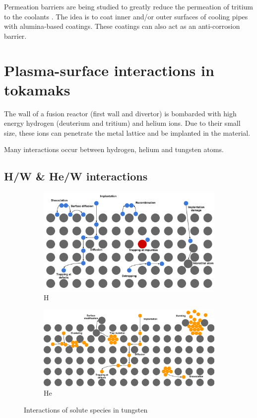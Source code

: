 Permeation barriers are being studied to greatly reduce the permeation of tritium to the coolants .
The idea is to coat inner and/or outer surfaces of cooling pipes with alumina-based coatings.
These coatings can also act as an anti-corrosion barrier.

\section{Plasma-surface interactions in tokamaks}

The wall of a fusion reactor (first wall and divertor) is bombarded with high energy hydrogen (deuterium and tritium) and helium ions.
Due to their small size, these ions can penetrate the metal lattice and be implanted in the material.

Many interactions occur between hydrogen, helium and tungsten atoms.

\subsection{H/W \& He/W interactions}
\begin{figure}[h!]
    \begin{subfigure}{0.9\linewidth}
        \includegraphics[width=\linewidth]{Figures/Chapter1/HI transport sketch.pdf}
        \caption{H}
    \end{subfigure}
    \begin{subfigure}{0.9\linewidth}
        \includegraphics[width=\linewidth]{Figures/Chapter1/He transport sketch.pdf}
        \caption{He}
    \end{subfigure}
    \caption{Interactions of solute species in tungsten}
\end{figure}

